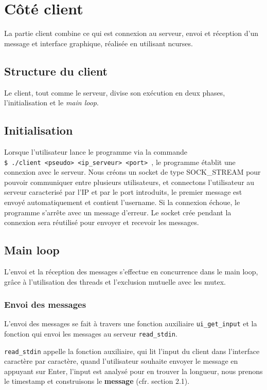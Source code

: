 
\section{Côté client}
    La partie client combine ce qui est connexion au serveur,
    envoi et réception d'un message et interface graphique, 
    réalisée en utilisant ncurses.
        \subsection{Structure du client}
        Le client, tout comme le serveur, divise son exécution
        en deux phases, l'initialisation et le \emph{main loop}.
        \subsection{Initialisation}
        Lorsque l'utilisateur lance le programme via la commande \\
        \texttt{\$ ./client <pseudo> <ip\_serveur> <port> }, le programme établit une 
        connexion avec le serveur.
        Nous créons un socket de type SOCK\_STREAM pour pouvoir communiquer entre
        plusieurs utilisateurs, et connectons l'utilisateur au serveur caracterisé 
        par l'IP et par le port introduits,
        le premier message est envoyé automatiquement et contient l'username.
        Si la connexion échoue, le programme s'arrête avec un message d'erreur.
        Le socket crée pendant la connexion sera réutilisé pour envoyer et recevoir les messages.
        \subsection{Main loop}
            L'envoi et la réception des messages s'effectue en concurrence dans le main loop,
            grâce à l'utilisation des threads et l'exclusion mutuelle avec les mutex.
            \subsubsection{Envoi des messages}
                L'envoi des messages se fait à travers une fonction auxiliaire
                \texttt{ui\_get\_input} et la fonction qui envoi les messages
                au serveur \texttt{read\_stdin}.

                \texttt{read\_stdin} appelle la fonction auxiliaire,
                qui lit l'input du client dans l'interface
                caractère par caractère, quand l'utilisateur souhaite 
                envoyer le message en appuyant sur Enter, l'input est analysé
                pour en trouver la longueur, nous prenons le timestamp et  
                construisons le \verb@struct@ \textbf{message} (cfr. section 2.1).
                
